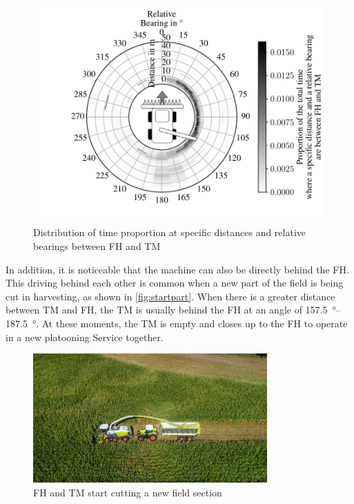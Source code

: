 \begin{figure}[H]
	\centering
	\includegraphics[width=0.99\textwidth]{figures/bearingHarvestScenario50.pdf}
	\caption{Distribution of time proportion at specific distances and relative bearings between \acf{FH} and \acf{TM}}%
	\label{fig:bearing}%
\end{figure}

In addition, it is noticeable that the machine can also be directly behind the \ac{FH}. This driving behind each other is common when a new part of the field is being cut in harvesting, as shown in \autoref{fig:startpart}. When there is a greater distance between \ac{TM} and \ac{FH}, the \ac{TM} is usually behind the FH at an angle of \SIrange{157.5}{187.5}{\degree}. At these moments, the \ac{TM} is empty and closes up to the \ac{FH} to operate in a new platooning Service together. 

\begin{figure}[H]%
	\centering
	\includegraphics[width=0.8\textwidth]{figures/claas_harvest_behind.png}
	\caption{\acf{FH} and \acf{TM} start cutting a new field section}%
	\label{fig:startpart}%
\end{figure}

